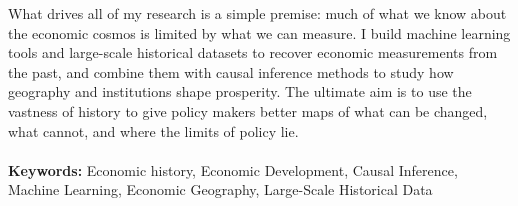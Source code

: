 What drives all of my research is a simple premise: much of what we know about the economic cosmos is limited by what we can measure. I build machine learning tools and large-scale historical datasets to recover economic measurements from the past, and combine them with causal inference methods to study how geography and institutions shape prosperity. The ultimate aim is to use the vastness of history to give policy makers better maps of what can be changed, what cannot, and where the limits of policy lie.
\\ \\
\textbf{Keywords:} Economic history, Economic Development, Causal Inference, Machine Learning, Economic Geography, Large-Scale Historical Data